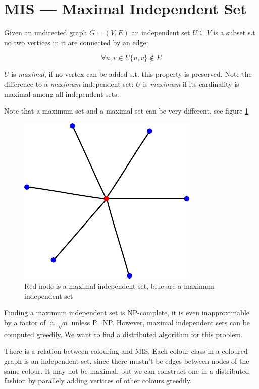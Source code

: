 \section{MIS --- Maximal Independent Set}

\begin{Def} Given an undirected graph $G=(V,E)$ an independent set $U\subseteq V$ is a subset s.t no two vertices in it are connected by an edge:

\[\forall u,v \in U \{u,v\}\not \in E\]

$U$ is \emph{maximal}, if no vertex can be added s.t. this property is preserved. Note the difference to a \emph{maximum} independent set: $U$ is \emph{maximum} if its cardinality is maximal among all independent sets.
\end{Def}

Note that a maximum set and a maximal set can be very different, see figure \ref{fig:maximum_vs_maximal_is} 

\begin{figure}[hbt]
\begin{center}
\includegraphics{./images/mis}
\end{center}
\caption{Red node is a maximal independent set, blue are a maximum independent set}
\label{fig:maximum_vs_maximal_is}
\end{figure}

Finding a maximum independent set is NP-complete, it is even inapproximable by a factor of $\approx \sqrt{n}$ unless P=NP. However, maximal independent sets can be computed greedily. We want to find a distributed algorithm for this problem.

There is a relation between colouring and MIS. Each colour class in a coloured graph is an independent set, since there mustn't be edges between nodes of the same colour. It may not be maximal, but we can construct one in a distributed fashion by parallely adding vertices of other colours greedily.


